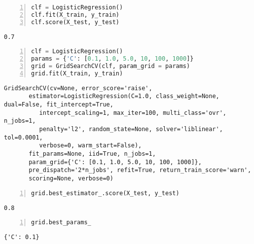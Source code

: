 \documentclass[10pt,parskip=half,
	toc=sectionentrywithdots,
	bibliography=totocnumbered,
	captions=tableheading,numbers=noendperiod]{scrartcl}
\begin{document}
\begin{lstlisting}[language=Python,numbers=left,xleftmargin=20pt,xrightmargin=5pt,belowskip=5pt,aboveskip=5pt]
clf = LogisticRegression()
clf.fit(X_train, y_train)
clf.score(X_test, y_test)
\end{lstlisting}

\begin{lstlisting}[language={},postbreak={},numbers=none,xrightmargin=7pt,breakindent=0pt,aboveskip=5pt,belowskip=5pt]
0.7
\end{lstlisting}

\begin{lstlisting}[language=Python,numbers=left,xleftmargin=20pt,xrightmargin=5pt,belowskip=5pt,aboveskip=5pt]
clf = LogisticRegression()
params = {'C': [0.1, 1.0, 5.0, 10, 100, 1000]}
grid = GridSearchCV(clf, param_grid = params)
grid.fit(X_train, y_train)
\end{lstlisting}

\begin{lstlisting}[language={},postbreak={},numbers=none,xrightmargin=7pt,breakindent=0pt,aboveskip=5pt,belowskip=5pt]
GridSearchCV(cv=None, error_score='raise',
       estimator=LogisticRegression(C=1.0, class_weight=None, dual=False, fit_intercept=True,
          intercept_scaling=1, max_iter=100, multi_class='ovr', n_jobs=1,
          penalty='l2', random_state=None, solver='liblinear', tol=0.0001,
          verbose=0, warm_start=False),
       fit_params=None, iid=True, n_jobs=1,
       param_grid={'C': [0.1, 1.0, 5.0, 10, 100, 1000]},
       pre_dispatch='2*n_jobs', refit=True, return_train_score='warn',
       scoring=None, verbose=0)
\end{lstlisting}

\begin{lstlisting}[language=Python,numbers=left,xleftmargin=20pt,xrightmargin=5pt,belowskip=5pt,aboveskip=5pt]
grid.best_estimator_.score(X_test, y_test)
\end{lstlisting}

\begin{lstlisting}[language={},postbreak={},numbers=none,xrightmargin=7pt,breakindent=0pt,aboveskip=5pt,belowskip=5pt]
0.8
\end{lstlisting}

\begin{lstlisting}[language=Python,numbers=left,xleftmargin=20pt,xrightmargin=5pt,belowskip=5pt,aboveskip=5pt]
grid.best_params_
\end{lstlisting}

\begin{lstlisting}[language={},postbreak={},numbers=none,xrightmargin=7pt,breakindent=0pt,aboveskip=5pt,belowskip=5pt]
{'C': 0.1}
\end{lstlisting}
\end{document}
